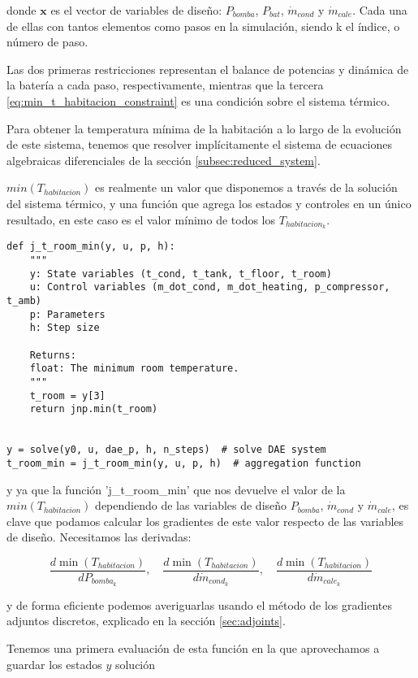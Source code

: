 donde $\mathbf{x}$ es el vector de variables de diseño: $P_{bomba}$, $P_{bat}$,
$\dot{m}_{cond}$ y $\dot{m}_{cale}$. Cada una de ellas con tantos elementos
como pasos en la simulación, siendo k el índice, o número de paso.

Las dos primeras restricciones representan el balance de potencias y dinámica
de la batería a cada paso, respectivamente, mientras que la tercera
\eqref{eq:min_t_habitacion_constraint} es una condición sobre el sistema
térmico.

Para obtener la temperatura mínima de la habitación a lo largo de la evolución
de este sistema, tenemos que resolver implícitamente el sistema de ecuaciones
algebraicas diferenciales de la sección \ref{subsec:reduced_system}.

$min(T_{habitacion})$ es realmente un valor que disponemos a través de la
solución del sistema térmico, y una función que agrega los estados y controles
en un único resultado, en este caso es el valor mínimo de todos los
$T_{habitacion_k}$.

\begin{verbatim}
def j_t_room_min(y, u, p, h):
    """
    y: State variables (t_cond, t_tank, t_floor, t_room)
    u: Control variables (m_dot_cond, m_dot_heating, p_compressor, t_amb)
    p: Parameters
    h: Step size

    Returns:
    float: The minimum room temperature.
    """
    t_room = y[3]
    return jnp.min(t_room)


y = solve(y0, u, dae_p, h, n_steps)  # solve DAE system
t_room_min = j_t_room_min(y, u, p, h)  # aggregation function
\end{verbatim}


y ya que la función 'j\_t\_room\_min' que nos devuelve el valor de la
$min(T_{habitacion})$ dependiendo de las variables de diseño $P_{bomba}$,
$\dot{m}_{cond}$ y $\dot{m}_{cale}$, es clave que podamos calcular los
gradientes de este valor respecto de las variables de diseño. Necesitamos las
derivadas:

\begin{equation*}
	\frac{d \min(T_{habitacion})}{d P_{bomba_k}}, \quad \frac{d \min(T_{habitacion})}{d \dot{m}_{cond_k}}, \quad \frac{d \min(T_{habitacion})}{d \dot{m}_{cale_k}}
\end{equation*}

y de forma eficiente podemos averiguarlas usando el método de los gradientes
adjuntos discretos, explicado en la sección \ref{sec:adjoints}.

Tenemos una primera evaluación de esta función en la que aprovechamos a guardar
los estados $y$ solución

